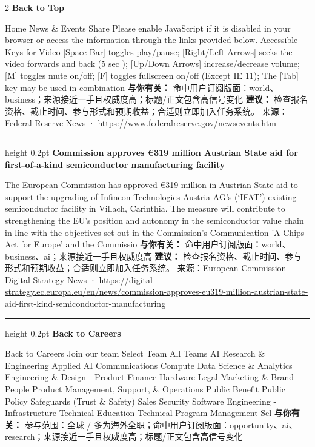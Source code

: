 \documentclass[10.5pt]{ctexart}
\begin{document}
\begin{multicols}{2}
{\large\bfseries Back to Top}\par
Home News \& Events Share Please enable JavaScript if it is disabled in your browser or access the information through the links provided below. Accessible Keys for Video [Space Bar] toggles play/pause; [Right/Left Arrows] seeks the video forwards and back (5 sec ); [Up/Down Arrows] increase/decrease volume; [M] toggles mute on/off; [F] toggles fullscreen on/off (Except IE 11); The [Tab] key may be used in combination
\textbf{与你有关：} 命中用户订阅版面：world、business；来源接近一手且权威度高；标题/正文包含高信号变化
\textbf{建议：} 检查报名资格、截止时间、参与形式和预期收益；合适则立即加入任务系统。
{\footnotesize\color{ormuted} 来源：Federal Reserve News · \url{https://www.federalreserve.gov/newsevents.htm}}
\vspace{2mm}
\hrule height 0.2pt
\vspace{2mm}
{\large\bfseries Commission approves €319 million Austrian State aid for first-of-a-kind semiconductor manufacturing facility}\par
The European Commission has approved €319 million in Austrian State aid to support the upgrading of Infineon Technologies Austria AG’s (‘IFAT’) existing semiconductor facility in Villach, Carinthia. The measure will contribute to strengthening the EU’s position and autonomy in the semiconductor value chain in line with the objectives set out in the Commission's Communication 'A Chips Act for Europe' and the Commissio
\textbf{与你有关：} 命中用户订阅版面：world、business、ai；来源接近一手且权威度高
\textbf{建议：} 检查报名资格、截止时间、参与形式和预期收益；合适则立即加入任务系统。
{\footnotesize\color{ormuted} 来源：European Commission Digital Strategy News · \url{https://digital-strategy.ec.europa.eu/en/news/commission-approves-eu319-million-austrian-state-aid-first-kind-semiconductor-manufacturing}}
\vspace{2mm}
\hrule height 0.2pt
\vspace{2mm}
{\large\bfseries Back to Careers}\par
Back to Careers Join our team Select Team All Teams AI Research \& Engineering Applied AI Communications Compute Data Science \& Analytics Engineering \& Design - Product Finance Hardware Legal Marketing \& Brand People Product Management, Support, \& Operations Public Benefit Public Policy Safeguards (Trust \& Safety) Sales Security Software Engineering - Infrastructure Technical Education Technical Program Management Sel
\textbf{与你有关：} 参与范围：全球 / 多为海外全职；命中用户订阅版面：opportunity、ai、research；来源接近一手且权威度高；标题/正文包含高信号变化

\end{multicols}
\end{document}
